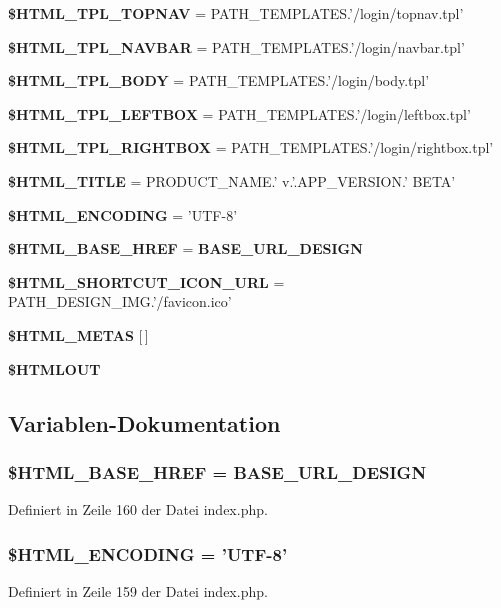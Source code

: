 \begin{CompactItemize}
\item 
{\bf \$HTML\_\-TPL\_\-TOPNAV} = PATH\_\-TEMPLATES.'/login/topnav.tpl'
\item 
{\bf \$HTML\_\-TPL\_\-NAVBAR} = PATH\_\-TEMPLATES.'/login/navbar.tpl'
\item 
{\bf \$HTML\_\-TPL\_\-BODY} = PATH\_\-TEMPLATES.'/login/body.tpl'
\item 
{\bf \$HTML\_\-TPL\_\-LEFTBOX} = PATH\_\-TEMPLATES.'/login/leftbox.tpl'
\item 
{\bf \$HTML\_\-TPL\_\-RIGHTBOX} = PATH\_\-TEMPLATES.'/login/rightbox.tpl'
\item 
{\bf \$HTML\_\-TITLE} = PRODUCT\_\-NAME.' v.'.APP\_\-VERSION.' BETA'
\item 
{\bf \$HTML\_\-ENCODING} = 'UTF-8'
\item 
{\bf \$HTML\_\-BASE\_\-HREF} = {\bf BASE\_\-URL\_\-DESIGN}
\item 
{\bf \$HTML\_\-SHORTCUT\_\-ICON\_\-URL} = PATH\_\-DESIGN\_\-IMG.'/favicon.ico'
\item 
{\bf \$HTML\_\-METAS} [$\,$]
\item 
{\bf \$HTMLOUT}
\end{CompactItemize}


\subsection{Variablen-Dokumentation}
\subsubsection{\setlength{\rightskip}{0pt plus 5cm}\$HTML\_\-BASE\_\-HREF = {\bf BASE\_\-URL\_\-DESIGN}}\label{index_8php_bdd3b27cd848a5c3c8bc46b030a87eb3}




Definiert in Zeile 160 der Datei index.php.
\subsubsection{\setlength{\rightskip}{0pt plus 5cm}\$HTML\_\-ENCODING = 'UTF-8'}\label{index_8php_d7fdb84ca914d8fc89cc328e4c09c70c}




Definiert in Zeile 159 der Datei index.php.
